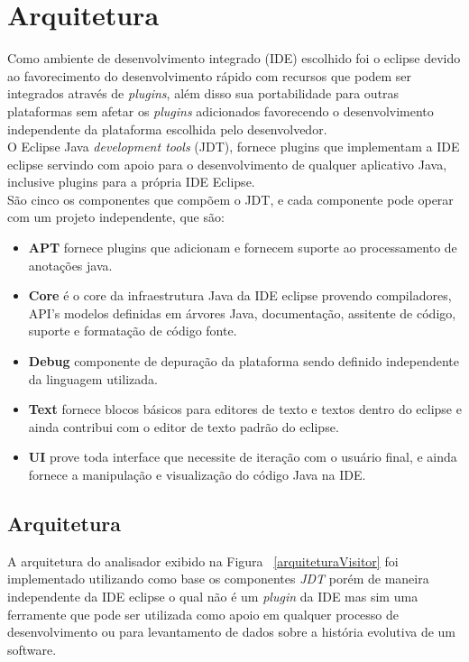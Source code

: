\chapter {Arquitetura}

Como ambiente de desenvolvimento integrado (IDE) escolhido foi o eclipse devido ao favorecimento do desenvolvimento rápido com recursos que podem ser integrados através de {\it plugins}, além disso sua portabilidade para outras plataformas sem afetar os {\it plugins} adicionados favorecendo o desenvolvimento independente da plataforma escolhida pelo desenvolvedor.\\

O Eclipse Java {\it development tools} (JDT), fornece plugins que implementam a IDE eclipse servindo com apoio para o desenvolvimento de qualquer aplicativo Java, inclusive plugins para a própria IDE Eclipse.\\

São cinco os componentes que compõem o JDT, e cada componente pode operar com um projeto independente, que são:

	\begin{itemize}
		\item \textbf{APT} fornece plugins que adicionam e fornecem suporte ao processamento de anotações java.
		\item \textbf{Core} é o core da infraestrutura Java da IDE eclipse provendo compiladores, API's modelos definidas em árvores Java, documentação, assitente de código, suporte e formatação de código fonte.
		\item \textbf{Debug} componente de depuração da plataforma sendo definido independente da linguagem utilizada.
		\item \textbf{Text} fornece blocos básicos para editores de texto e textos dentro do eclipse e ainda contribui com o editor de texto padrão do eclipse. \item \textbf{UI} prove toda interface que necessite de iteração com o usuário final, e ainda fornece a manipulação e visualização do código Java na IDE.
	\end{itemize} 
	
\section {Arquitetura}

A arquitetura do analisador exibido na Figura ~\ref{arquiteturaVisitor} foi  implementado utilizando como base os componentes \textit{JDT} porém de maneira independente da IDE eclipse o qual não é um {\it plugin} da IDE mas sim uma ferramente que pode ser utilizada como apoio em qualquer processo de desenvolvimento ou para levantamento de dados sobre a história evolutiva de um software.\\

